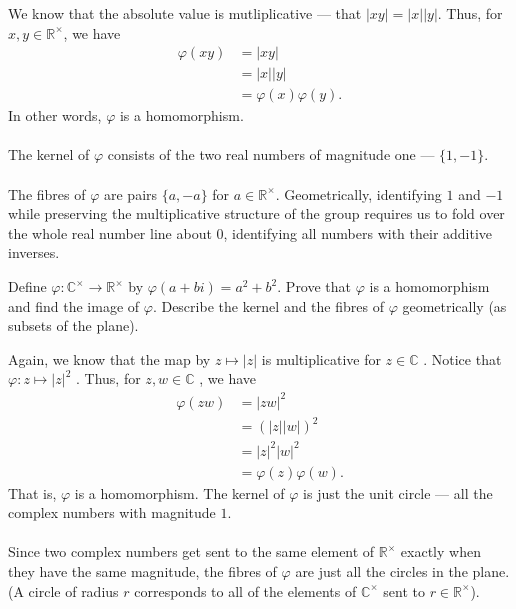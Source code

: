 \documentclass[12 pt, letterpaper]{hmcpset}
\begin{document}
\begin{solution}
	We know that the absolute value is mutliplicative --- that $\lvert xy \rvert = \lvert x \rvert \lvert y \rvert$. Thus, for $x, y \in \mathbb{R}^{\times}$, we have
	\[
		\begin{split}
			\varphi(xy) & = \lvert xy \rvert \\
				    & = \lvert x \rvert \lvert y \rvert \\
				    & = \varphi(x) \varphi(y).
		\end{split}
	\]
	In other words, $\varphi$ is a homomorphism. \\\\
	The kernel of $\varphi$ consists of the two real numbers of magnitude one --- $\{ 1, -1 \}$. \\\\
	The fibres of $\varphi$ are pairs $\{ a, -a \}$ for $a \in \mathbb{R}^{\times}$. Geometrically, identifying $1$ and $-1$ while preserving the multiplicative structure of the group requires us to fold over the whole real number line about $0$, identifying all numbers with their additive inverses.
\end{solution}

\pagebreak

\begin{problem}
	Define $\varphi : \mathbb{C}^{\times} \to \mathbb{R}^{\times}$ by $\varphi(a + bi) = a^{2} + b^{2}$. Prove that $\varphi$ is a homomorphism and find the image of $\varphi$. Describe the kernel and the fibres of $\varphi$ geometrically (as subsets of the plane).
\end{problem}

\begin{solution}
	Again, we know that the map by $z \mapsto \lvert z \rvert$  is multiplicative for $z \in \mathbb{C}$ . Notice that $\varphi : z \mapsto \lvert z \rvert^{2}$ . Thus, for $z, w \in \mathbb{C}$ , we have
	\[
		\begin{split}
			\varphi(zw) & = \lvert zw \rvert^{2} \\
				    & = (\lvert z \rvert \lvert w \rvert)^{2} \\
				    & = \lvert z \rvert^{2} \lvert w \rvert^{2} \\
				    & = \varphi(z) \varphi(w).
		\end{split}
	\] 
	That is, $\varphi$ is a homomorphism. The kernel of $\varphi$ is just the unit circle --- all the complex numbers with magnitude $1$. \\\\
	Since two complex numbers get sent to the same element of $\mathbb{R}^{\times}$ exactly when they have the same magnitude, the fibres of $\varphi$ are just all the circles in the plane. (A circle of radius $r$ corresponds to all of the elements of $\mathbb{C}^{\times}$ sent to $r \in \mathbb{R}^{\times}$).
\end{solution}
\end{document}
